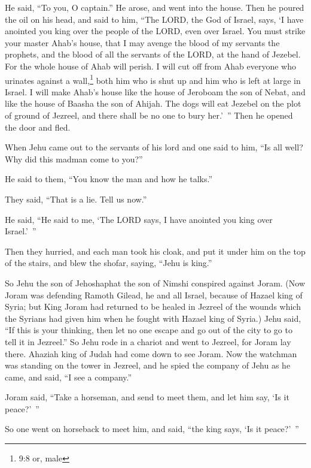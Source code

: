 He said, “To you, O captain.”
\myverse{}He arose, and went into the house. Then he poured the oil on his head, and said
to him, “The LORD, the God of Israel, says, ‘I have anointed you king over the people of the LORD, even
over Israel.
\myverse{}You must strike your master Ahab’s house, that I may avenge the blood of my
servants the prophets, and the blood of all the servants of the LORD, at the hand of Jezebel.
\myverse{}For the whole house of Ahab will perish. I will cut off from Ahab everyone who
urinates against a wall,\footnote{9:8 or, male} both him who is shut up and him who is left at large in Israel.
\myverse{}I will make Ahab’s house like the house of Jeroboam the son of Nebat, and like
the house of Baasha the son of Ahijah.
\myverse{}The dogs will eat Jezebel on the plot of ground of Jezreel, and there shall
be no one to bury her.’ ” Then he opened the door and fled.

\myverse{}When Jehu came out to the servants of his lord and one said to
him, “Is all well? Why did this madman come to you?”

He said to them, “You know the man and how he talks.”

\myverse{}They said, “That is a lie. Tell us now.”

He said, “He said to me, ‘The LORD says, I have anointed you king over Israel.’ ”

\myverse{}Then they hurried, and each man took his cloak, and put it under
him on the top of the stairs, and blew the shofar, saying, “Jehu is king.”

\myverse{}So Jehu the son of Jehoshaphat the son of Nimshi conspired against
Joram. (Now Joram was defending Ramoth Gilead, he and all Israel, because of Hazael king of Syria;
\myverse{}but King Joram had returned to be healed in Jezreel of the wounds which the
Syrians had given him when he fought with Hazael king of Syria.) Jehu said, “If this is your thinking,
then let no one escape and go out of the city to go to tell it in Jezreel.”
\myverse{}So Jehu rode in a chariot and went to Jezreel, for Joram lay there. Ahaziah
king of Judah had come down to see Joram.
\myverse{}Now the watchman was standing on the tower in Jezreel, and he spied the company
of Jehu as he came, and said, “I see a company.”

Joram said, “Take a horseman, and send to meet them, and let him say, ‘Is it peace?’ ”

\myverse{}So one went on horseback to meet him, and said, “the king says,
‘Is it peace?’ ”

